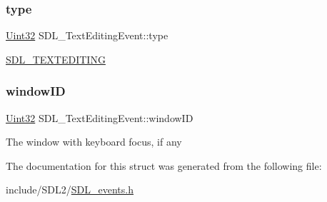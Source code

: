 \subsubsection{\texorpdfstring{type}{type}}
{\footnotesize\ttfamily \hyperlink{_s_d_l__stdinc_8h_add440eff171ea5f55cb00c4a9ab8672d}{Uint32} S\+D\+L\+\_\+\+Text\+Editing\+Event\+::type}

\hyperlink{_s_d_l__events_8h_a3b589e89be6b35c02e0dd34a55f3fccaa1b80c465df69c0b6d06f026ce7a230e3}{S\+D\+L\+\_\+\+T\+E\+X\+T\+E\+D\+I\+T\+I\+NG} \mbox{\label{struct_s_d_l___text_editing_event_a23b3e414cf7a7ccc547b7595ca930049}} 
\subsubsection{\texorpdfstring{window\+ID}{windowID}}
{\footnotesize\ttfamily \hyperlink{_s_d_l__stdinc_8h_add440eff171ea5f55cb00c4a9ab8672d}{Uint32} S\+D\+L\+\_\+\+Text\+Editing\+Event\+::window\+ID}

The window with keyboard focus, if any 

The documentation for this struct was generated from the following file\+:\begin{DoxyCompactItemize}
\item 
include/\+S\+D\+L2/\hyperlink{_s_d_l__events_8h}{S\+D\+L\+\_\+events.\+h}\end{DoxyCompactItemize}

